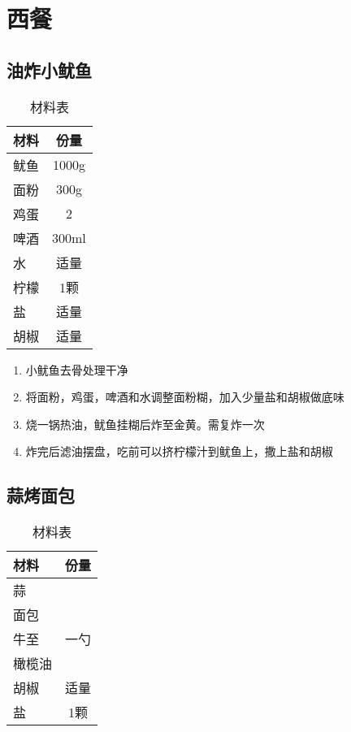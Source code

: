 \chapter{西餐}

\section{油炸小鱿鱼}

\begin{table}[H]
    \centering
    \begin{tabular}{|l||c|}\hline
     \textbf{材料}    &  \textbf{份量}\\ \hline\hline
    鱿鱼 & 1000g \\ \hline
    面粉 &  300g \\ \hline
    鸡蛋 & 2  \\ \hline
    啤酒 & 300ml  \\ \hline
    水 & 适量 \\ \hline
    柠檬 & 1颗 \\ \hline
    盐 & 适量 \\ \hline
    胡椒 & 适量 \\ \hline
    \end{tabular}
    \caption{材料表}
\end{table}

\begin{enumerate}
    \item 小鱿鱼去骨处理干净
    \item 将面粉，鸡蛋，啤酒和水调整面粉糊，加入少量盐和胡椒做底味
    \item 烧一锅热油，鱿鱼挂糊后炸至金黄。需复炸一次
    \item 炸完后滤油摆盘，吃前可以挤柠檬汁到鱿鱼上，撒上盐和胡椒
\end{enumerate}


\section{蒜烤面包}

\begin{table}[H]
    \centering
    \begin{tabular}{|l||c|}\hline
     \textbf{材料}    &  \textbf{份量}\\ \hline\hline
    蒜 &  \\ \hline
    面包 &   \\ \hline
    牛至 & 一勺  \\ \hline
    橄榄油 &   \\ \hline
    胡椒 & 适量 \\ \hline
    盐 & 1颗 \\ \hline
    \end{tabular}
    \caption{材料表}
\end{table}

